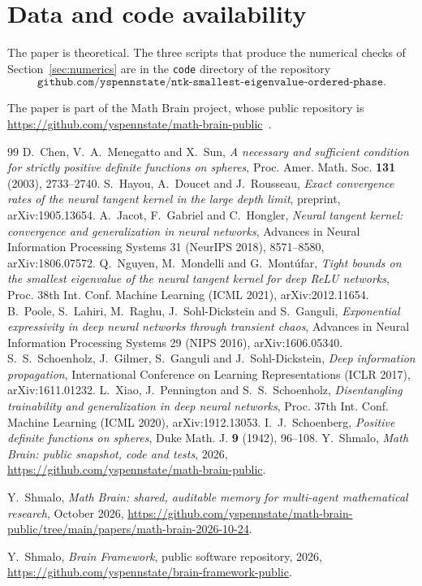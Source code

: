 \documentclass[11pt]{amsart}
\theoremstyle{remark}\newtheorem{remark}[theorem]{Remark}
\begin{document}
\section*{Data and code availability}

The paper is theoretical. The three scripts that produce the numerical checks of Section~\ref{sec:numerics} are in the \texttt{code} directory of the repository
\[
\texttt{github.com/yspennstate/ntk-smallest-eigenvalue-ordered-phase}.
\]

The paper is part of the Math Brain project, whose public repository is \url{https://github.com/yspennstate/math-brain-public}~\cite{MathBrainRepo}.

\begin{thebibliography}{99}
 D.~Chen, V.~A.~Menegatto and X.~Sun, \emph{A necessary and sufficient condition for strictly positive
definite functions on spheres}, Proc. Amer. Math. Soc. \textbf{131} (2003), 2733--2740.
 S.~Hayou, A.~Doucet and J.~Rousseau, \emph{Exact convergence rates of the neural tangent kernel in the
large depth limit}, preprint, arXiv:1905.13654.
 A.~Jacot, F.~Gabriel and C.~Hongler, \emph{Neural tangent kernel: convergence and generalization in neural
networks}, Advances in Neural Information Processing Systems 31 (NeurIPS 2018), 8571--8580, arXiv:1806.07572.
 Q.~Nguyen, M.~Mondelli and G.~Mont\'ufar, \emph{Tight bounds on the smallest eigenvalue of the neural
tangent kernel for deep ReLU networks}, Proc. 38th Int. Conf. Machine Learning (ICML 2021), arXiv:2012.11654.
 B.~Poole, S.~Lahiri, M.~Raghu, J.~Sohl-Dickstein and S.~Ganguli, \emph{Exponential expressivity in deep
neural networks through transient chaos}, Advances in Neural Information Processing Systems 29 (NIPS 2016),
arXiv:1606.05340.
 S.~S.~Schoenholz, J.~Gilmer, S.~Ganguli and J.~Sohl-Dickstein, \emph{Deep information propagation},
International Conference on Learning Representations (ICLR 2017), arXiv:1611.01232.
 L.~Xiao, J.~Pennington and S.~S.~Schoenholz, \emph{Disentangling trainability and generalization in deep
neural networks}, Proc. 37th Int. Conf. Machine Learning (ICML 2020), arXiv:1912.13053.
 I.~J.~Schoenberg, \emph{Positive definite functions on spheres}, Duke Math. J. \textbf{9} (1942),
96--108.
 Y.~Shmalo, \emph{Math Brain: public snapshot, code and tests}, 2026, \url{https://github.com/yspennstate/math-brain-public}.

 Y.~Shmalo, \emph{Math Brain: shared, auditable memory for multi-agent mathematical research}, October 2026, \url{https://github.com/yspennstate/math-brain-public/tree/main/papers/math-brain-2026-10-24}.

 Y.~Shmalo, \emph{Brain Framework}, public software repository, 2026, \url{https://github.com/yspennstate/brain-framework-public}.

\end{thebibliography}
\end{document}
